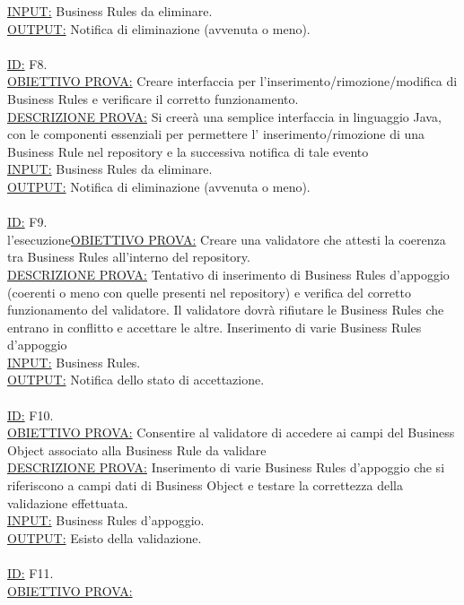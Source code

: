 \documentclass[11pt,titlepage,a4paper]{report}
\begin{document}
\underline{INPUT:} Business Rules da eliminare.\\
\underline{OUTPUT:} Notifica di eliminazione (avvenuta o meno).\\
\\
\underline{ID:} F8.\\
\underline{OBIETTIVO PROVA:} Creare interfaccia per l'inserimento/rimozione/modifica di Business Rules e verificare il corretto funzionamento. \\
\underline{DESCRIZIONE PROVA:} Si creer\`a  una semplice interfaccia in linguaggio Java, con le componenti essenziali per permettere l' inserimento/rimozione di una Business Rule nel repository e la successiva notifica di tale evento\\
\underline{INPUT:} Business Rules da eliminare.\\
\underline{OUTPUT:} Notifica di eliminazione (avvenuta o meno).\\
\\
\underline{ID:} F9.\\
l'esecuzione\underline{OBIETTIVO PROVA:} Creare una validatore che attesti la coerenza tra Business Rules all'interno del repository. \\
\underline{DESCRIZIONE PROVA:} Tentativo di inserimento di Business Rules d'appoggio (coerenti o meno con quelle presenti nel repository) e verifica del corretto funzionamento del validatore. Il validatore dovr\`a rifiutare le Business Rules che entrano in conflitto e accettare le altre. Inserimento di varie Business Rules d'appoggio\\
\underline{INPUT:} Business Rules. \\
\underline{OUTPUT:} Notifica dello stato di accettazione. \\
\\
\underline{ID:} F10.\\
\underline{OBIETTIVO PROVA:} Consentire al validatore di accedere ai campi del Business Object associato alla Business Rule da validare\\
\underline{DESCRIZIONE PROVA:} Inserimento di varie Business Rules d'appoggio che si riferiscono a campi dati di Business Object e testare la correttezza della validazione effettuata.\\
\underline{INPUT:} Business Rules d'appoggio. \\
\underline{OUTPUT:} Esisto della validazione. \\
\\
\underline{ID:} F11.\\
\underline{OBIETTIVO PROVA:} \\
\end{document}
